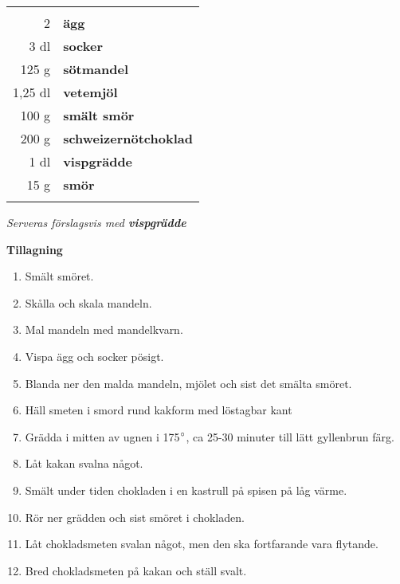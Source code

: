 \documentclass[a4paper,12pt]{article}
\newcommand{\tillb}[1]{\noindent \textit{Serveras förslagsvis med \textbf{#1}} \vspace{1cm}}
\begin{document}
\begin{table}[H]
	\begin{tabular}{rl}
	\hline
	&\\
		2 & \textbf{ägg}\\
		3 dl & \textbf{socker}\\
		125 g & \textbf{sötmandel}\\
		1,25 dl & \textbf{vetemjöl}\\
		100 g & \textbf{smält smör}\\
		200 g & \textbf{schweizernötchoklad}\\
		1 dl & \textbf{vispgrädde}\\
		15 g& \textbf{smör}\\
	&\\
	\hline
	\end{tabular}
\end{table}

\tillb{vispgrädde}

\begin{multicols*}{2}

\noindent \textbf{Tillagning}
\begin{enumerate}
	\itemsep0cm
	\item Smält smöret.
	\item Skålla och skala mandeln.
	\item Mal mandeln med mandelkvarn.
	\item Vispa ägg och socker pösigt.
	\item Blanda ner den malda mandeln, mjölet och sist det smälta smöret.
	\item Häll smeten i smord rund kakform med löstagbar kant
	\item Grädda i mitten av ugnen i 175$\degree$, ca 25-30 \mbox{minuter} till lätt gyllenbrun färg.
	\item Låt kakan svalna något.
	\item Smält under tiden chokladen i en kastrull på spisen på låg värme.
	\item Rör ner grädden och sist smöret i chokladen.
	\item Låt chokladsmeten svalan något, men den ska fortfarande vara flytande.
	\item Bred chokladsmeten på kakan och ställ svalt.
\end{enumerate}

\end{multicols*}

\clearpage
\end{document}
